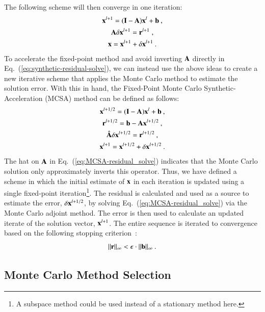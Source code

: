 \documentclass[preprint,12pt]{elsarticle}
\newcommand{\vA}{\ensuremath{\ve{A}}}
\newcommand{\vb}{\ensuremath{\ve{b}}}
\newcommand{\vx}{\ensuremath{\ve{x}}}
\newcommand{\vr}{\ensuremath{\ve{r}}}
\newcommand{\vI}{\ensuremath{\ve{I}}}
\begin{document}
The following scheme will then converge in one iteration:
\begin{subequations}
  \begin{gather}
    \vx^{l+1} = (\vI - \vA)\vx^l + \vb\:,\\ \vA \delta \vx^{l+1} =
    \vr^{l+1}\;,
    \label{eq:synthetic-residual-solve}\\ 
    \vx=\vx^{l+1}+\delta\vx^{l+1}\:.
  \end{gather}
\end{subequations}
To accelerate the fixed-point method and avoid inverting $\vA$ directly in
Eq.~(\ref{eq:synthetic-residual-solve}), we can instead use the above ideas to
create a new iterative scheme that applies the Monte Carlo method to estimate
the solution error. With this in hand, the Fixed-Point Monte Carlo
Synthetic-Acceleration (MCSA) method can be defined as follows:
\begin{subequations}
  \label{eq:MCSA-iteration}
  \begin{gather}
    \vx^{l+1/2} = (\vI - \vA)\vx^l + \vb\:,\\  \vr^{l+1/2} = \vb -
    \vA\vx^{l+1/2}\:,
    \label{eq:MCSA-residual}\\     
     \hat{\vA}\delta\vx^{l+1/2} = \vr^{l+1/2}\:,
    \label{eq:MCSA-residual_solve}\\ 
     \vx^{l+1}=\vx^{l+1/2}+\delta\vx^{l+1/2}\:.
  \end{gather}
\end{subequations}
The hat on $\vA$ in Eq.~(\ref{eq:MCSA-residual_solve}) indicates that the
Monte Carlo solution only approximately inverts this operator.  Thus, we have
defined a scheme in which the initial estimate of $\vx$ in each iteration is
updated using a single fixed-point iteration\footnote{A subspace method could
  be used instead of a stationary method here.}.  The residual is calculated
and used as a source to estimate the error, $\delta\vx^{l+1/2}$, by solving
Eq.~(\ref{eq:MCSA-residual_solve}) via the Monte Carlo adjoint method. The
error is then used to calculate an updated iterate of the solution vector,
$\vx^{l+1}$.  The entire sequence is iterated to convergence based on the
following stopping criterion~\cite{kelley_1995}:
\begin{equation}
  \|\vr\|_{\infty} < \epsilon\cdot\|\vb\|_\infty\:.
  \label{eq:stopping-criteria}
\end{equation}

\subsection{Monte Carlo Method Selection}
\end{document}
